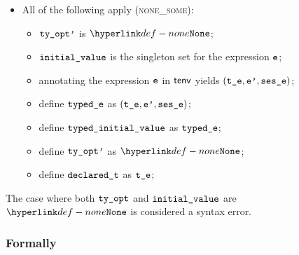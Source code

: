 \begin{itemize}
  \item All of the following apply (\textsc{none\_some}):
  \begin{itemize}
    \item $\tyoptp$ is $\None$;
    \item $\initialvalue$ is the singleton set for the expression $\ve$;
    \item annotating the expression $\ve$ in $\tenv$ yields $(\vte, \vep, \vsese)$\ProseOrTypeError;
    \item define $\typede$ as $(\vte, \vep, \vsese)$;
    \item define $\typedinitialvalue$ as $\typede$;
    \item define $\tyoptp$ as $\None$;
    \item define $\declaredt$ as $\vte$;
  \end{itemize}
\end{itemize}
The case where both $\tyopt$ and $\initialvalue$ are $\None$ is considered a syntax error.

\subsubsection{Formally}
\begin{mathpar}
\end{mathpar}

